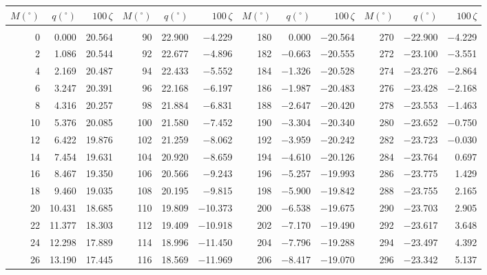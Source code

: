 \clearpage
\begin{table}[!h]\centering
\vspace{0.25cm}
\scriptsize{ \begin{tabular}{rrr|rrr|rrr|rrr}
$M(^\circ)$ & $q(^\circ)$  & $100\,\zeta$ & $M(^\circ)$ & $q(^\circ)$  & $100\,\zeta$ & $M(^\circ)$ & $q(^\circ)$  & $100\,\zeta$& $M(^\circ)$ & $q(^\circ)$  & $100\,\zeta$\\\hline
&&&&&&&&&&&\\[-1.75ex]
  0 &   0.000 & 20.564 &  90 &  22.900 & $-$4.229 & 180 &   0.000 & $-$20.564 & 270 & $-$22.900 & $-$4.229\\
  2 &   1.086 & 20.544 &  92 &  22.677 & $-$4.896 & 182 &  $-$0.663 & $-$20.555 & 272 & $-$23.100 & $-$3.551\\
  4 &   2.169 & 20.487 &  94 &  22.433 & $-$5.552 & 184 &  $-$1.326 & $-$20.528 & 274 & $-$23.276 & $-$2.864\\
  6 &   3.247 & 20.391 &  96 &  22.168 & $-$6.197 & 186 &  $-$1.987 & $-$20.483 & 276 & $-$23.428 & $-$2.168\\
  8 &   4.316 & 20.257 &  98 &  21.884 & $-$6.831 & 188 &  $-$2.647 & $-$20.420 & 278 & $-$23.553 & $-$1.463\\
 10 &   5.376 & 20.085 & 100 &  21.580 & $-$7.452 & 190 &  $-$3.304 & $-$20.340 & 280 & $-$23.652 & $-$0.750\\
 12 &   6.422 & 19.876 & 102 &  21.259 & $-$8.062 & 192 &  $-$3.959 & $-$20.242 & 282 & $-$23.723 & $-$0.030\\
 14 &   7.454 & 19.631 & 104 &  20.920 & $-$8.659 & 194 &  $-$4.610 & $-$20.126 & 284 & $-$23.764 &  0.697\\
 16 &   8.467 & 19.350 & 106 &  20.566 & $-$9.243 & 196 &  $-$5.257 & $-$19.993 & 286 & $-$23.775 &  1.429\\
 18 &   9.460 & 19.035 & 108 &  20.195 & $-$9.815 & 198 &  $-$5.900 & $-$19.842 & 288 & $-$23.755 &  2.165\\
 20 &  10.431 & 18.685 & 110 &  19.809 & $-$10.373 & 200 &  $-$6.538 & $-$19.675 & 290 & $-$23.703 &  2.905\\
 22 &  11.377 & 18.303 & 112 &  19.409 & $-$10.918 & 202 &  $-$7.170 & $-$19.490 & 292 & $-$23.617 &  3.648\\
 24 &  12.298 & 17.889 & 114 &  18.996 & $-$11.450 & 204 &  $-$7.796 & $-$19.288 & 294 & $-$23.497 &  4.392\\
 26 &  13.190 & 17.445 & 116 &  18.569 & $-$11.969 & 206 &  $-$8.417 & $-$19.070 & 296 & $-$23.342 &  5.137\\

\end{tabular}}
\end{table}

